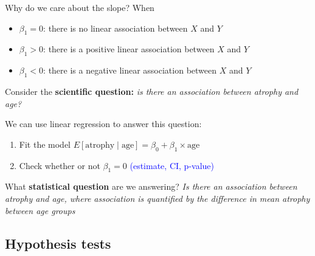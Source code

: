 \documentclass[10pt,t]{beamer}
\begin{document}
\begin{frame}{Why do we care about the slope?}
When
\begin{itemize}
	\item $\beta_1 = 0$: there is no linear association between $X$ and $Y$
	\item $\beta_1 > 0$: there is a positive linear association between $X$ and $Y$
	\item $\beta_1 < 0$: there is a negative linear association between $X$ and $Y$
\end{itemize}

\vspace{0.3cm}

Consider the \textbf{scientific question:} \textit{is there an association between atrophy and age?}

\vspace{0.3cm}

We can use linear regression to answer this question:

\begin{enumerate}
	\item Fit the model $E[\text{atrophy} \mid \text{age}] = \beta_0 + \beta_1 \times \text{age}$
	\item Check whether or not $\beta_1 = 0$ \textcolor{blue}{(estimate, CI, p-value)}
\end{enumerate}

\vspace{0.3cm}

What \textbf{statistical question} are we answering? \textit{Is there an association between atrophy and age, where association is quantified by the difference in mean atrophy between age groups}

\end{frame}

\subsection{Hypothesis tests}
\end{document}
